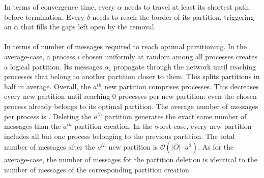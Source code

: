 \noindent In terms of convergence time, every $\alpha$ needs to travel
at least its shortest path before termination. Every $\delta$ needs to
reach the border of its partition, triggering an $\alpha$ that fills
the gaps left open by the removal. 

\paragraph{}
In terms of number of messages required to reach optimal
partitioning. In the average-case, a process $i$ chosen uniformly at
random among all processes creates a logical partition. Its messages
$\alpha_i$ propagate through the network until reaching processes that
belong to another partition closer to them. This splits partitions in
half in average. Overall, the $a^{th}$ new partition comprises
processes. This decreases every new partition until reaching $0$
processes per new partition: even the chosen process already belongs
to its optimal partition. The average number of messages per process
is .  Deleting the
$a^{th}$ partition generates the exact same number of messages than
the $a^{th}$ partition creation.  In the
worst-case, every new partition includes all but one process belonging
to the previous partition. The total number of messages after the
$a^{th}$ new partition is $\mathcal{O}(\overline{|O|}\cdot a^2)$. As
for the average-case, the number of messages for the partition
deletion is identical to the number of messages of the corresponding
partition creation.

\noindent {}


